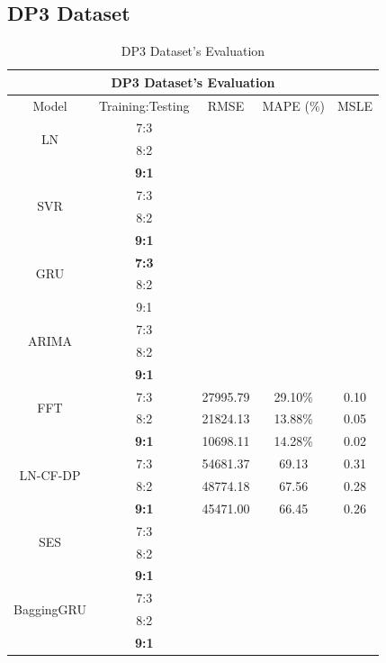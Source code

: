 \documentclass{ieeeojies}
\begin{document}
\subsection{DP3 Dataset} 
\begin{table}[H]
    \centering
    \begin{tabular}{|c|c|c|c|c|}
         \hline
         \multicolumn{5}{|c|}{\textbf{DP3 Dataset's Evaluation}}\\
         \hline
         \centering Model & Training:Testing & RMSE & MAPE (\%) & MSLE\\
         \hline
         \multirow{2}{*}{LN} & 7:3 & & & \\ & 8:2 & & & \\ & \textbf{9:1} & & & \\
         \hline
         \multirow{2}{*}{SVR} & 7:3&&&\\ & 8:2&&&\\ & \textbf{9:1} & & & \\
         \hline
         \multirow{2}{*}{GRU} & \textbf{7:3}	& & & \\ & 8:2 & & & \\ & 9:1 & & & \\
         \hline
         \multirow{2}{*}{ARIMA} & 7:3 &  &  & \\ & 8:2 &  & & \\ & \textbf{9:1} & & & \\
         \hline
         \multirow{2}{*}{FFT}& 7:3& 27995.79& 29.10\%& 0.10\\ & 8:2 & 21824.13& 13.88\%& 0.05\\ & \textbf{9:1}& 10698.11& 14.28\%& 0.02
\\
         \hline
         \multirow{2}{*}{LN-CF-DP} & 7:3 & 54681.37 & 69.13 & 0.31 \\ & {8:2} & 48774.18 & 67.56 & 0.28 \\ & \textbf{9:1} & 45471.00 &66.45&0.26\\
         \hline
         \multirow{2}{*}{SES} & 7:3 & & & \\ & 8:2 & && \\ & \textbf{9:1} &  	&	& 	\\
         \hline
         \multirow{2}{*}{BaggingGRU} & 7:3 & &  &  \\ & 8:2 & &  &  \\ & \textbf{9:1} & & & \\
         \hline
    \end{tabular}
    \caption{DP3 Dataset's Evaluation}
    \label{dp3result}
\end{table}
\end{document}

